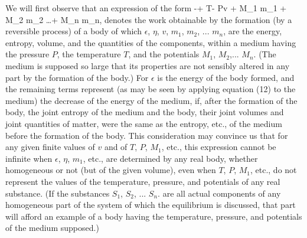 \documentclass[12pt]{article}
\begin{document}
We will first observe that an expression of the form
\eqs-\epsilon + T\eta - Pv + M_1 m_1 + M_2 m_2 \dots + M_n m_n,    \label{54}\eqe
denotes the work obtainable by the formation (by a reversible process) of a body of which $\epsilon$, $\eta$, $v$, $m_1$, $m_2$, ... $m_n$, are the energy, entropy, volume, and the quantities of the components, within a medium having the pressure $P$, the temperature $T$, and the potentials $M_1$, $M_2$,... $M_n$. (The medium is supposed so large that its properties are not sensibly altered in any part by the formation of the body.) For $\epsilon$ is the energy of the body formed, and the remaining terms represent (as may be seen by applying equation (12) to the medium) the decrease of the energy of the medium, if, after the formation of the body, the joint entropy of the medium and the body, their joint volumes and joint quantities of matter, were the same as the entropy, etc., of the medium before the formation of the body. This consideration may convince us that for any given finite values of $v$ and of $T$, $P$, $M_1$, etc., this expression cannot be infinite when $\epsilon$, $\eta$, $m_1$, etc., are determined by any real body, whether homogeneous or not (but of the given volume), even when $T$, $P$, $M_1$, etc., do not represent the values of the temperature, pressure, and potentials of any real substance. (If the substances $S_1$, $S_2$, ... $S_n$. are all actual components of any homogeneous part of the system of which the equilibrium is discussed, that part will afford an example of a body having the temperature, pressure, and potentials of the medium supposed.)
\end{document}
